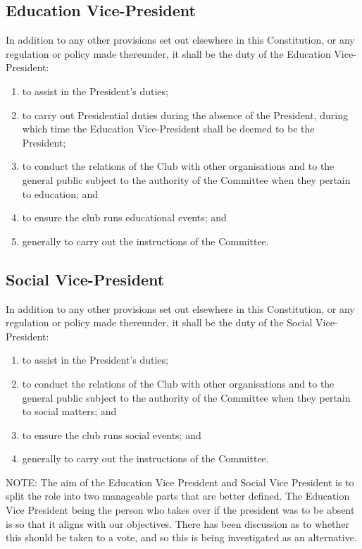 \documentclass[11pt]{article} %
\begin{document}
{\color{ForestGreen} \subsection{Education Vice-President}
In addition to any other provisions set out elsewhere in this Constitution, or any regulation or policy made thereunder, it shall be the duty of the Education Vice-President:
\begin{enumerate}
	\item to assist in the President's duties;
	\item to carry out Presidential duties during the absence of the President, during which time the Education Vice-President shall be deemed to be the President;
	\item to conduct the relations of the Club with other organisations and to the general public subject to the authority of the Committee when they pertain to education; and
	\item to ensure the club runs educational events; and
	\item generally to carry out the instructions of the Committee.
\end{enumerate}}

{\color{ForestGreen} \subsection{Social Vice-President}
In addition to any other provisions set out elsewhere in this Constitution, or any regulation or policy made thereunder, it shall be the duty of the Social Vice-President:
\begin{enumerate}
	\item to assist in the President's duties;
	\item to conduct the relations of the Club with other organisations and to the general public subject to the authority of the Committee when they pertain to social matters; and
	\item to ensure the club runs social events; and
	\item generally to carry out the instructions of the Committee.
\end{enumerate}}

{\color{Cyan}NOTE:
The aim of the Education Vice President and Social Vice President is to split the role into two manageable parts that are better defined.
The Education Vice President being the person who takes over if the president was to be absent is so that it aligns with our objectives.
There has been discussion as to whether this should be taken to a vote, and so this is being investigated as an alternative.
}
\end{document}
